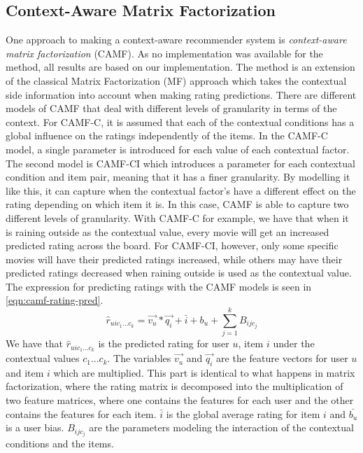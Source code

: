 \subsection{Context-Aware Matrix Factorization}
One approach to making a context-aware recommender system is \textit{context-aware matrix factorization} (CAMF)\cite{baltrunasCAMF}.
As no implementation was available for the method, all results are based on our implementation.
The method is an extension of the classical Matrix Factorization (MF) approach which takes the contextual side information into account when making rating predictions.
There are different models of CAMF that deal with different levels of granularity in terms of the context.
For CAMF-C, it is assumed that each of the contextual conditions has a global influence on the ratings independently of the items.
In the CAMF-C model, a single parameter is introduced for each value of each contextual factor.
The second model is CAMF-CI which introduces a parameter for each contextual condition and item pair, meaning that it has a finer granularity.
By modelling it like this, it can capture when the contextual factor's have a different effect on the rating depending on which item it is.
In this case, CAMF is able to capture two different levels of granularity.
With CAMF-C for example, we have that when it is raining outside as the contextual value, every movie will get an increased predicted rating across the board.
For CAMF-CI, however, only some specific movies will have their predicted ratings increased, while others may have their predicted ratings decreased when raining outside is used as the contextual value.
The expression for predicting ratings with the CAMF models is seen in \autoref{eqn:camf-rating-pred}.
\begin{equation}
    \label{eqn:camf-rating-pred}
    \hat{r}_{uic_1...c_k} = \vec{v_u} * \vec{q_i} + \bar{i} + b_u + \sum\limits_{j = 1}^k B_{ijc_j}
\end{equation}
We have that $\hat{r}_{uic_1...c_k}$ is the predicted rating for user $u$, item $i$ under the contextual values $c_1...c_k$.
The variables $\vec{v_u} $ and $ \vec{q_i}$ are the feature vectors for user $u$ and item $i$ which are multiplied.
This part is identical to what happens in matrix factorization, where the rating matrix is decomposed into the multiplication of two feature matrices, where one contains the features for each user and the other contains the features for each item.
$\bar{i}$ is the global average rating for item $i$ and $\bar{b_u}$ is a user bias. 
$B_{ijc_j}$ are the parameters modeling the interaction of the contextual conditions and the items.
